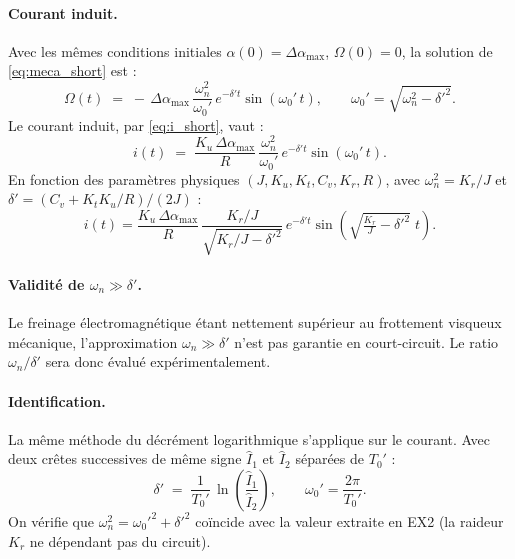 \paragraph{Courant induit.}
Avec les mêmes conditions initiales \(\alpha(0) = \Delta\alpha_{\max}\), \(\Omega(0) = 0\), la solution de \eqref{eq:meca_short} est :
\begin{equation}
\Omega(t) \;=\; -\,\Delta\alpha_{\max}\,\frac{\omega_n^2}{\omega_0'}\,e^{-\delta' t}\sin(\omega_0'\,t), \qquad \omega_0' = \sqrt{\omega_n^2 - \delta'^2}.
\end{equation}
Le courant induit, par \eqref{eq:i_short}, vaut :
\begin{equation}
i(t) \;=\; \frac{K_u\,\Delta\alpha_{\max}}{R}\,\frac{\omega_n^2}{\omega_0'}\,e^{-\delta' t}\sin(\omega_0'\,t).
\label{eq:i_t}
\end{equation}
En fonction des paramètres physiques \((J, K_u, K_t, C_v, K_r, R)\), avec \(\omega_n^2 = K_r/J\) et \(\delta' = (C_v + K_t K_u/R)/(2J)\) :
\begin{equation}
i(t) = \frac{K_u\,\Delta\alpha_{\max}}{R}\,\frac{K_r/J}{\sqrt{K_r/J - \delta'^2}}\,e^{-\delta' t}\sin\!\left(\sqrt{\tfrac{K_r}{J} - \delta'^2}\;t\right).
\end{equation}

\paragraph{Validité de \(\omega_n \gg \delta'\).}
Le freinage électromagnétique étant nettement supérieur au frottement visqueux mécanique, l'approximation \(\omega_n \gg \delta'\) n'est pas garantie en court-circuit. Le ratio \(\omega_n/\delta'\) sera donc évalué expérimentalement.

\paragraph{Identification.}
La même méthode du décrément logarithmique s'applique sur le courant. Avec deux crêtes successives de même signe \(\hat I_1\) et \(\hat I_2\) séparées de \(T_0'\) :
\begin{equation}
\delta' \;=\; \frac{1}{T_0'}\,\ln\!\left(\frac{\hat I_1}{\hat I_2}\right), \qquad \omega_0' = \frac{2\pi}{T_0'}.
\label{eq:deltap_decrement}
\end{equation}
On vérifie que \(\omega_n^2 = \omega_0'^2 + \delta'^2\) coïncide avec la valeur extraite en EX2 (la raideur \(K_r\) ne dépendant pas du circuit).

